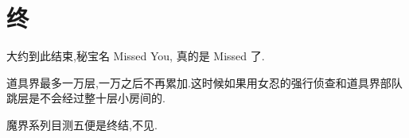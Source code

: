 \newpage

\section{终}

大约到此结束,秘宝名 Missed You, 真的是 Missed 了.

道具界最多一万层,一万之后不再累加.这时候如果用女忍的强行侦查和道具界部队跳层是不会经过整十层小房间的.

魔界系列目测五便是终结,不见.
